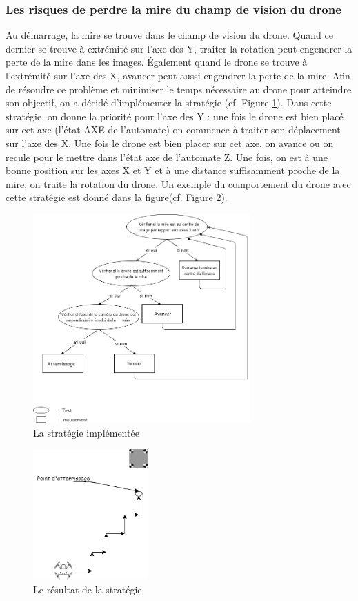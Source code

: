 \documentclass[12pt]{article}
\begin{document}
\subsubsection{Les risques de perdre la mire du champ de vision du drone}
Au démarrage, la mire se trouve dans le champ de vision du drone. Quand ce dernier se trouve à extrémité sur l'axe des Y, traiter la rotation peut engendrer la perte de la mire dans les images. Également quand le drone se trouve à l'extrémité sur l'axe des X, avancer peut aussi engendrer la perte de la mire. Afin de résoudre ce problème et minimiser le temps nécessaire au drone pour atteindre son objectif, on a décidé d’implémenter la stratégie (cf. Figure \ref{fig:image18}).
Dans cette stratégie, on donne la priorité pour l'axe des Y : une fois le drone est bien placé sur cet axe (l'état AXE de l'automate) on commence à traiter son déplacement sur l'axe des X. Une fois le drone est bien placer sur cet axe, on avance ou on recule pour le mettre dans l'état axe de l'automate Z. Une fois, on est à une bonne position sur les axes X et Y et à une distance suffisamment proche de la mire, on traite la rotation du drone. Un exemple du comportement du drone avec cette stratégie est donné dans la figure(cf. Figure \ref{fig:image17}). \\
\begin{figure}[H]
\centering
\includegraphics[height=8cm]{image18.png}
\caption{La stratégie implémentée}
\label{fig:image18}
\end{figure}
\begin{figure}[H]
\centering
\includegraphics[height=5cm]{image17.png}
\caption{Le résultat de la stratégie}
\label{fig:image17}
\end{figure}
\end{document}
